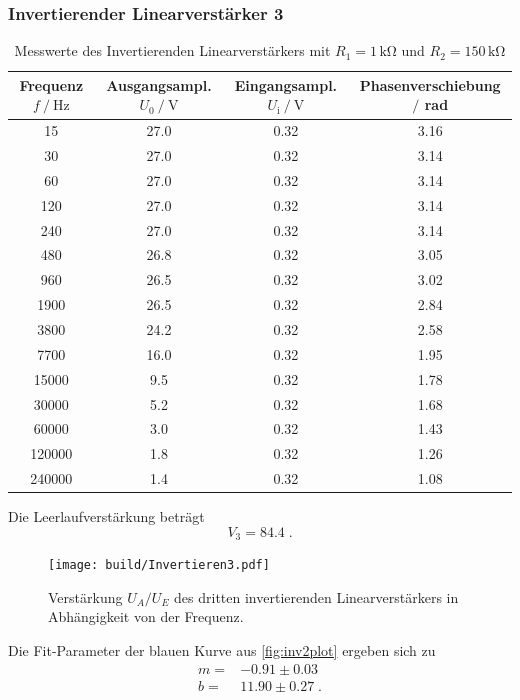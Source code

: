 \subsubsection{Invertierender Linearverstärker 3}
\label{sec:InvertierenderLinearverstärker3}

\begin{table}
    \centering
    \caption{Messwerte des Invertierenden Linearverstärkers mit $R_1=1\,\unit{\kilo\ohm}$ und $R_2=150\,\unit{\kilo\ohm}$}
    \begin{tabular}{c c c c}
        \toprule
        Frequenz $f\mathbin{/}\unit{\hertz}$ & Ausgangsampl. $U_0\mathbin{/}\unit{\volt}$& Eingangsampl. $U_{\text{i}}\mathbin{/}\unit{\volt}$ & Phasenverschiebung $\mathbin{/}$ rad\\
        \midrule
        15& 27.0&	0.32&	3.16\\		
        30&	27.0&	0.32&	3.14\\		
        60&	27.0&	0.32&	3.14\\		
        120&	27.0&	0.32&	3.14\\		
        240&	27.0&	0.32&	3.14\\		
        480&	26.8&	0.32&	3.05\\		
        960&	26.5&	0.32&	3.02\\		
        1900&	26.5&	0.32&	2.84\\	
        3800&	24.2&	0.32&	2.58\\	
        7700&	16.0&	0.32&	1.95\\	
        15000&	9.5&	0.32&	1.78\\		
        30000&	5.2&	0.32&	1.68\\		
        60000&	3.0&	0.32&	1.43\\	
        120000&	1.8&	0.32&	1.26\\	
        240000&	1.4&	0.32& 1.08	\\
        \bottomrule
    \end{tabular}
    \label{tab:InvAmp3}
\end{table}
Die Leerlaufverstärkung beträgt
\begin{equation*}
    V_3= 84.4\; .
\end{equation*}

\begin{figure}
    \centering
    \texttt{[image: build/Invertieren3.pdf]}
    \caption{Verstärkung $U_A/U_E$ des dritten invertierenden Linearverstärkers in Abhängigkeit von der Frequenz.}
    \label{fig:inv3plot}
\end{figure}
Die Fit-Parameter der blauen Kurve aus \autoref{fig:inv2plot} ergeben sich zu
\begin{align*}
    m=&-0.91\pm 0.03 \\
    b=& 11.90\pm 0.27\; .
\end{align*}

